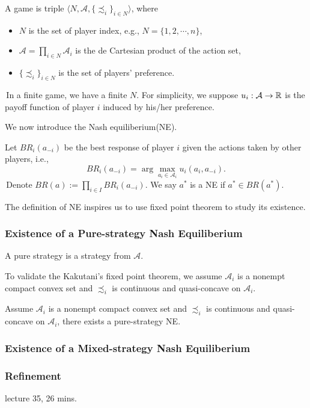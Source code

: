 A game is triple $\langle N,\mathcal{A}, \{\precsim_i\}_{i\in N}\rangle$, where
\begin{itemize}
    \item $N$ is the set of player index, e.g., $N = \{1,2,\cdots, n\}$,
    \item $\mathcal{A}= \prod_{i\in N} \mathcal{A}_i$ is the de Cartesian product of the action set,
    \item $\{\precsim_i\}_{i\in N}$ is the set of players' preference.
\end{itemize}
\,In a finite game, we have a finite $N$. For simplicity, we suppose $u_i: \mathcal{A} \to \mathbb{R}$ is the payoff function of player $i$ induced by his/her preference.

We now introduce the Nash equiliberium(NE).
\begin{definition}
    Let $BR_i(a_{-i})$ be the best response of player $i$ given the actions taken by other players, i.e.,
    $$BR_i(a_{-i})=\arg \max_{a_i\in \mathcal{A}_i} u_i(a_i,a_{-i}).$$
    \,Denote $BR(a) := \prod_{i\in I} BR_i(a_{-i})$. We say $a^*$ is a NE if $a^* \in BR(a^*)$.
\end{definition}

The definition of NE inspires us to use fixed point theorem to study its existence.
\subsubsection{Existence of a Pure-strategy Nash Equiliberium}
\begin{definition}
    A pure strategy is a strategy from $\mathcal{A}$.
\end{definition}

To validate the Kakutani's fixed point theorem, we assume $\mathcal{A}_i$ is a nonempt compact convex set and $\precsim_i$ is continuous and quasi-concave on $\mathcal{A}_i$.
\begin{theorem}
    Assume $\mathcal{A}_i$ is a nonempt compact convex set and $\precsim_i$ is continuous and quasi-concave on $\mathcal{A}_i$, there exists a pure-strategy NE.
\end{theorem}
\subsubsection{Existence of a Mixed-strategy Nash Equiliberium}
\begin{definition}
    
\end{definition}
\subsubsection{Refinement}
lecture 35, 26 mins.




